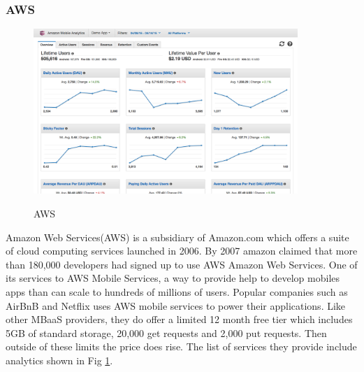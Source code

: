 \subsubsection{AWS}

\begin{figure}[!h]
    \caption{AWS}
    \centering
    \includegraphics[width=100mm]{images/aws}
    \label{fig:aws}
\end{figure}

Amazon Web Services(AWS) \cite{aws} is a subsidiary of Amazon.com which offers a suite of cloud computing services launched in 2006.  By 2007 amazon claimed that more than 180,000 developers had signed up to use AWS Amazon Web Services. One of its services to AWS Mobile Services, a way to provide help to develop mobiles apps than can scale to hundreds of millions of users. Popular companies such as AirBnB and Netflix uses AWS mobile services to power their applications. Like other MBaaS providers, they do offer a limited 12 month free tier which includes 5GB of standard storage, 20,000 get requests and 2,000 put requests. Then outside of these limits the price does rise. The list of services they provide include analytics shown in Fig \ref{fig:aws}.




